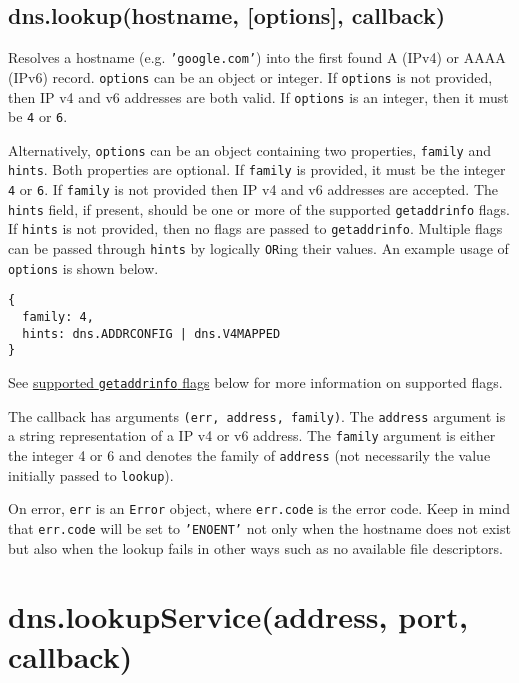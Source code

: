 \subsection{dns.lookup(hostname, {[}options{]},
callback)}\label{dns.lookuphostname-options-callback}

Resolves a hostname (e.g. \texttt{'google.com'}) into the first found A
(IPv4) or AAAA (IPv6) record. \texttt{options} can be an object or
integer. If \texttt{options} is not provided, then IP v4 and v6
addresses are both valid. If \texttt{options} is an integer, then it
must be \texttt{4} or \texttt{6}.

Alternatively, \texttt{options} can be an object containing two
properties, \texttt{family} and \texttt{hints}. Both properties are
optional. If \texttt{family} is provided, it must be the integer
\texttt{4} or \texttt{6}. If \texttt{family} is not provided then IP v4
and v6 addresses are accepted. The \texttt{hints} field, if present,
should be one or more of the supported \texttt{getaddrinfo} flags. If
\texttt{hints} is not provided, then no flags are passed to
\texttt{getaddrinfo}. Multiple flags can be passed through
\texttt{hints} by logically \texttt{OR}ing their values. An example
usage of \texttt{options} is shown below.

\begin{verbatim}
{
  family: 4,
  hints: dns.ADDRCONFIG | dns.V4MAPPED
}
\end{verbatim}

See \hyperref[dnsux5fsupportedux5fgetaddrinfoux5fflags]{supported
\texttt{getaddrinfo} flags} below for more information on supported
flags.

The callback has arguments \texttt{(err, address, family)}. The
\texttt{address} argument is a string representation of a IP v4 or v6
address. The \texttt{family} argument is either the integer 4 or 6 and
denotes the family of \texttt{address} (not necessarily the value
initially passed to \texttt{lookup}).

On error, \texttt{err} is an \texttt{Error} object, where
\texttt{err.code} is the error code. Keep in mind that \texttt{err.code}
will be set to \texttt{'ENOENT'} not only when the hostname does not
exist but also when the lookup fails in other ways such as no available
file descriptors.

\section{dns.lookupService(address, port,
callback)}\label{dns.lookupserviceaddress-port-callback}

